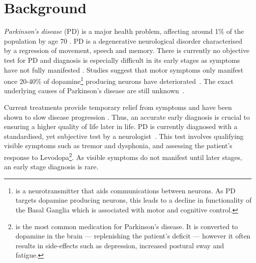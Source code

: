 \documentclass[12pt, twoside]{book}
\renewcommand\emph[1]{\textit{\color{USred}{#1}}}
\begin{document}
\chapter{Background}
\label{bgchapter}
\textit{Parkinson's disease} (PD) is a major health problem, affecting around 1\% of the population by age 70 \cite{savittdiagnosis1}. PD is a degenerative neurological disorder characterised by a regression of movement, speech and memory. There is currently no objective test for PD and diagnosis is especially difficult in its early stages as symptoms have not fully manifested \cite{brooksdiagnosis25}. Studies suggest that motor symptoms only manifest once 20-40\% of dopamine\footnote{
\emph{Dopamine} is a neurotransmitter that aids communications between neurons. As PD targets dopamine producing neurons, this leads to a decline in functionality of the Basal Ganglia which is associated with motor and cognitive control.  } producing neurons have deteriorated~\cite{bernheimer1973brain}. The exact underlying causes of Parkinson's disease are still unknown~\cite{savittdiagnosis1}.


Current treatments provide temporary relief from symptoms and have been shown to slow disease progression \cite{slowprog1, slowprog2, slowprog3} . Thus, an accurate early diagnosis is crucial to ensuring a higher quality of life later in life. PD is currently diagnosed with a standardised, yet subjective test by a neurologist~\cite{tolosadiagnosis26}. This test involves qualifying visible symptoms such as tremor and dysphonia, and assessing the patient's response to Levodopa\footnote{\emph{Levodopa} is the most common medication for Parkinson's disease. It is converted to dopamine in the brain --- replenishing the patient's deficit --- however it often results in side-effects such as depression, increased postural sway and fatigue.}. As visible symptoms do not manifest until later stages, an early stage diagnosis is rare. 
\end{document}
